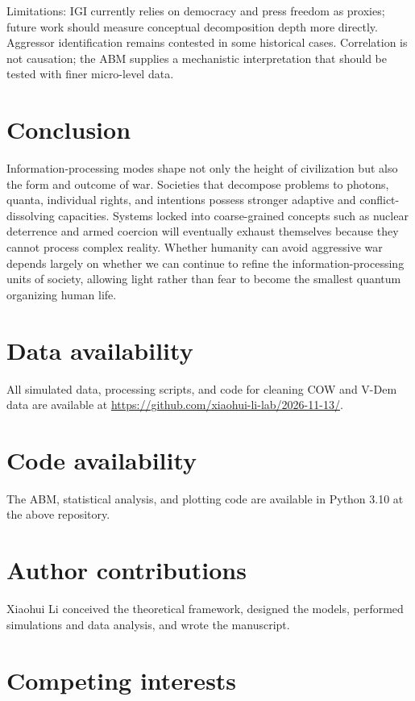 \documentclass[11pt,a4paper]{article}
\begin{document}
Limitations: IGI currently relies on democracy and press freedom as proxies; future work should measure conceptual decomposition depth more directly. Aggressor identification remains contested in some historical cases. Correlation is not causation; the ABM supplies a mechanistic interpretation that should be tested with finer micro-level data.

\section{Conclusion}

Information-processing modes shape not only the height of civilization but also the form and outcome of war. Societies that decompose problems to photons, quanta, individual rights, and intentions possess stronger adaptive and conflict-dissolving capacities. Systems locked into coarse-grained concepts such as nuclear deterrence and armed coercion will eventually exhaust themselves because they cannot process complex reality. Whether humanity can avoid aggressive war depends largely on whether we can continue to refine the information-processing units of society, allowing light rather than fear to become the smallest quantum organizing human life.

\section*{Data availability}

All simulated data, processing scripts, and code for cleaning COW and V-Dem data are available at \url{https://github.com/xiaohui-li-lab/2026-11-13/}.

\section*{Code availability}

The ABM, statistical analysis, and plotting code are available in Python 3.10 at the above repository.

\section*{Author contributions}

Xiaohui Li conceived the theoretical framework, designed the models, performed simulations and data analysis, and wrote the manuscript.

\section*{Competing interests}
\end{document}
